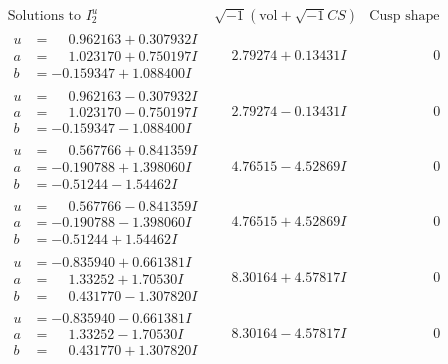 \documentclass[1p]{elsarticle_modified}
\theoremstyle{definition}
\newcommand{\I}{\sqrt{-1}}
\begin{document}
$$\begin{array}{c|c|c}  
\text{Solutions to }I^u_{2}& \I (\text{vol} + \sqrt{-1}CS) & \text{Cusp shape}\\
 \hline 
\begin{aligned}
u &= \phantom{-}0.962163 + 0.307932 I \\
a &= \phantom{-}1.023170 + 0.750197 I \\
b &= -0.159347 + 1.088400 I\end{aligned}
 & \phantom{-}2.79274 + 0.13431 I & \phantom{-0.000000 } 0 \\ \hline\begin{aligned}
u &= \phantom{-}0.962163 - 0.307932 I \\
a &= \phantom{-}1.023170 - 0.750197 I \\
b &= -0.159347 - 1.088400 I\end{aligned}
 & \phantom{-}2.79274 - 0.13431 I & \phantom{-0.000000 } 0 \\ \hline\begin{aligned}
u &= \phantom{-}0.567766 + 0.841359 I \\
a &= -0.190788 + 1.398060 I \\
b &= -0.51244 - 1.54462 I\end{aligned}
 & \phantom{-}4.76515 - 4.52869 I & \phantom{-0.000000 } 0 \\ \hline\begin{aligned}
u &= \phantom{-}0.567766 - 0.841359 I \\
a &= -0.190788 - 1.398060 I \\
b &= -0.51244 + 1.54462 I\end{aligned}
 & \phantom{-}4.76515 + 4.52869 I & \phantom{-0.000000 } 0 \\ \hline\begin{aligned}
u &= -0.835940 + 0.661381 I \\
a &= \phantom{-}1.33252 + 1.70530 I \\
b &= \phantom{-}0.431770 - 1.307820 I\end{aligned}
 & \phantom{-}8.30164 + 4.57817 I & \phantom{-0.000000 } 0 \\ \hline\begin{aligned}
u &= -0.835940 - 0.661381 I \\
a &= \phantom{-}1.33252 - 1.70530 I \\
b &= \phantom{-}0.431770 + 1.307820 I\end{aligned}
 & \phantom{-}8.30164 - 4.57817 I & \phantom{-0.000000 } 0 \\ \hline\begin{aligned}

\end{aligned}
\end{array}$$
\end{document}
